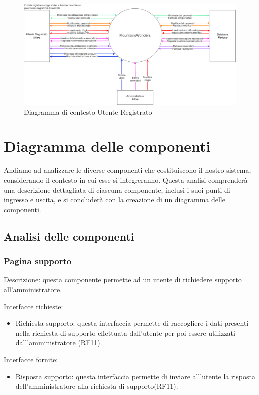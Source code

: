 \documentclass[a4paper,12pt]{article}
\begin{document}
\begin{figure}[H]
   \centering   \includegraphics[width=1.0\textwidth]{img-D2/contesto_registrato.png}
    \caption{Diagramma di contesto Utente Registrato}
\end{figure}
\newpage
\section{Diagramma delle componenti}
Andiamo ad analizzare le diverse componenti che costituiscono il nostro sistema, considerando il contesto in cui esse si integreranno. Questa analisi comprenderà una descrizione dettagliata di ciascuna componente, inclusi i suoi punti di ingresso e uscita, e si concluderà con la creazione di un diagramma delle componenti.


\subsection{Analisi delle componenti}

\subsubsection{Pagina supporto}
\underline{Descrizione}: questa componente permette ad un utente di richiedere supporto all'amministratore.

\underline{Interfacce richieste:}
\begin{itemize}
\item Richiesta supporto: questa interfaccia permette di raccogliere i dati presenti nella richiesta di supporto effettuata dall'utente per poi essere utilizzati dall'amministratore (RF11).
\end{itemize}

\underline{Interfacce fornite:}
\begin{itemize}
\item Risposta supporto: questa interfaccia permette di inviare all'utente la risposta dell'amministratore alla richiesta di supporto(RF11).
\end{itemize}
\end{document}
